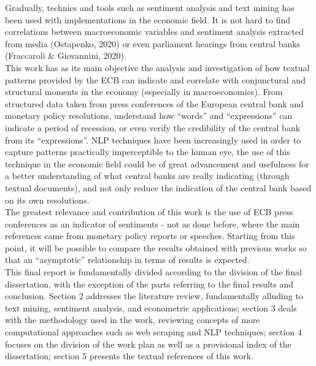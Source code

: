 Gradually, technics and tools such as sentiment analysis and text mining has been used with implementations in the economic field. It is not hard to find correlations between macroeconomic variables and sentiment analysis extracted from media (Ostapenko, 2020) or even parliament hearings from central banks (Fraccaroli \& Giovannini, 2020).\\

This work has as its main objective the analysis and investigation of how textual patterns provided by the ECB can indicate and correlate with conjunctural and structural moments in the economy (especially in macroeconomics). From structured data taken from press conferences of the European central bank and monetary policy resolutions, understand how “words” and “expressions” can indicate a period of recession, or even verify the credibility of the central bank from its “expressions”. NLP techniques have been increasingly used in order to capture patterns practically imperceptible to the human eye, the use of this technique in the economic field could be of great advancement and usefulness for a better understanding of what central banks are really indicating (through textual documents), and not only reduce the indication of the central bank based on its own resolutions.\\

The greatest relevance and contribution of this work is the use of ECB press conferences as an indicator of sentiments - not as done before, where the main references came from monetary policy reports or speeches. Starting from this point, it will be possible to compare the results obtained with previous works so that an “asymptotic” relationship in terms of results is expected.\\

This final report is fundamentally divided according to the division of the final dissertation, with the exception of the parts referring to the final results and conclusion. Section 2 addresses the literature review, fundamentally alluding to text mining, sentiment analysis, and econometric applications; section 3 deals with the methodology used in the work, reviewing concepts of more computational approaches such as web scraping and NLP techniques; section 4 focuses on the division of the work plan as well as a provisional index of the dissertation; section 5 presents the textual references of this work.

